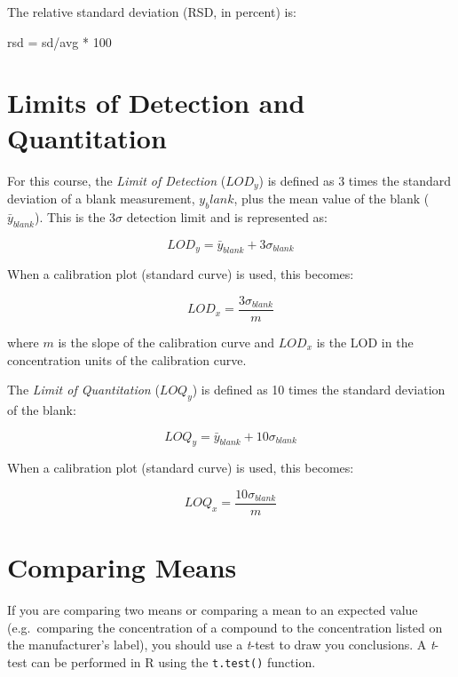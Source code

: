 \documentclass[]{tufte-book}
\newenvironment{Shaded}{}{}
\newcommand{\DecValTok}[1]{\textcolor[rgb]{0.25,0.63,0.44}{#1}}
\newcommand{\NormalTok}[1]{#1}
\newcommand{\OperatorTok}[1]{\textcolor[rgb]{0.40,0.40,0.40}{#1}}
\newcommand{\StringTok}[1]{\textcolor[rgb]{0.25,0.44,0.63}{#1}}
\begin{document}
The relative standard deviation (RSD, in percent) is:

\begin{Shaded}
\begin{Highlighting}[]
\NormalTok{rsd =}\StringTok{ }\NormalTok{sd}\OperatorTok{/}\NormalTok{avg }\OperatorTok{*}\StringTok{ }\DecValTok{100}
\end{Highlighting}
\end{Shaded}

\hypertarget{limits-of-detection-and-quantitation-1}{%
\section*{Limits of Detection and Quantitation}\label{limits-of-detection-and-quantitation-1}}

For this course, the \emph{Limit of Detection} (\(LOD_y\)) is defined as 3 times the standard deviation of a blank measurement, \(y_blank\), plus the mean value of the blank (\(\bar{y}_{blank}\)). This is the 3\(\sigma\) detection limit and is represented as:

\[
LOD_y = \bar{y}_{blank} + 3\sigma_{blank}
\]

When a calibration plot (standard curve) is used, this becomes:

\[
LOD_x = \frac{3\sigma_{blank}}{m}
\]

\noindent where \(m\) is the slope of the calibration curve and \(LOD_x\) is the LOD in the concentration units of the calibration curve.

The \emph{Limit of Quantitation} (\(LOQ_y\)) is defined as 10 times the standard deviation of the blank:

\[
LOQ_y = \bar{y}_{blank} + 10\sigma_{blank}
\]

When a calibration plot (standard curve) is used, this becomes:

\[
LOQ_x = \frac{10\sigma_{blank}}{m}
\]

\hypertarget{comparing-means}{%
\section*{Comparing Means}\label{comparing-means}}

If you are comparing two means or comparing a mean to an expected value (e.g.~comparing the concentration of a compound to the concentration listed on the manufacturer's label), you should use a \emph{t}-test to draw you conclusions. A \emph{t}-test can be performed in R using the \texttt{t.test()} function.
\end{document}
